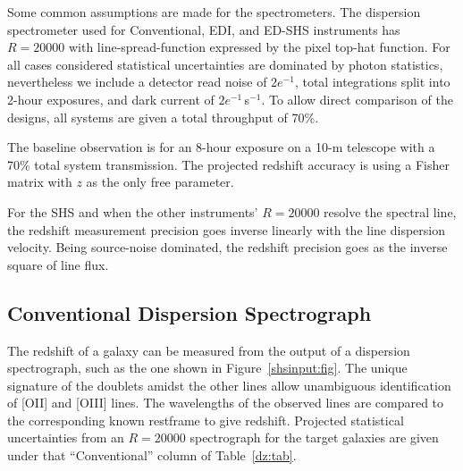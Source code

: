 \documentclass[preprint]{aastex}
\begin{document}
Some common assumptions are made for the spectrometers.
The dispersion spectrometer used for Conventional, EDI, and ED-SHS instruments has $R=20000$ with
line-spread-function expressed by the pixel top-hat function.
For all cases considered statistical uncertainties are dominated by photon statistics, nevertheless
we include a detector read noise of $2e^{-1}$, total integrations split into 2-hour exposures, and dark current of $2e^{-1}$\,s$^{-1}$.  To allow direct comparison of the 
designs, all systems are given a total throughput of 70\%.

The baseline observation is for an 8-hour exposure on a 10-m telescope with a 70\% total
system transmission.  The projected redshift accuracy is using a Fisher matrix with $z$ as the only free parameter. 

For the SHS and when the other instruments' $R=20000$ resolve the spectral line, the redshift measurement precision goes inverse linearly
with the line dispersion velocity.  Being source-noise dominated, the redshift precision goes as the inverse square of line flux. 

\subsection{Conventional Dispersion Spectrograph} 
The redshift of a galaxy can be measured from the output of a dispersion spectrograph, such as the one shown in Figure~\ref{shsinput:fig}.
The unique signature
of the doublets amidst the other lines allow unambiguous identification of [OII] and [OIII] lines. 
The wavelengths of the observed lines are compared to the corresponding known restframe to give redshift.
Projected statistical uncertainties from an $R=20000$ spectrograph for the target galaxies are given under
that ``Conventional'' column of Table~\ref{dz:tab}.
\end{document}
